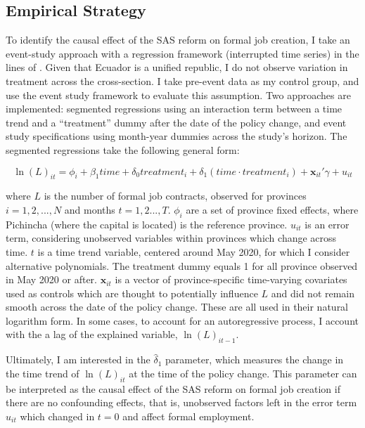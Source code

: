 \documentclass[11pt,a4paper]{article}\usepackage[]{graphicx}\usepackage[]{xcolor}
\begin{document}
\subsection{Empirical Strategy}

To identify the causal effect of the SAS reform on formal job creation, I take an event-study approach with a regression framework (interrupted time series) in the lines of \textcite{Taljaard.2014}. Given that Ecuador is a unified republic, I do not observe variation in treatment across the cross-section. I take pre-event data as my control group, and use the event study framework to evaluate this assumption. Two approaches are implemented: segmented regressions using an interaction term between a time trend and a ``treatment'' dummy after the date of the policy change, and event study specifications using month-year dummies across the study's horizon. The segmented regressions take the following general form:

\begin{equation}
\label{eqn:seg}
\ln(L)_{it} = \phi_i + \beta_1 time + \delta_0 treatment_{i} + \delta_1(time \cdot treatment_{i}) + \mathbf{x}_{it}'\gamma + u_{it}
\end{equation}

where $L$ is the number of formal job contracts, observed for provinces $i = 1, 2, ..., N$ and months $t = 1,2 ..., T$. $\phi_i$ are a set of province fixed effects, where Pichincha (where the capital is located) is the reference province. $u_{it}$ is an error term, considering unobserved variables within provinces which change across time. $t$ is a time trend variable, centered around May 2020, for which I consider alternative polynomials. The treatment dummy equals 1 for all province observed in May 2020 or after. $\mathbf{x}_{it}$ is a vector of province-specific time-varying covariates used as controls which are thought to potentially influence $L$ and did not remain smooth across the date of the policy change. These are all used in their natural logarithm form. In some cases, to account for an autoregressive process, I account with the a lag of the explained variable, $\ln(L)_{it-1}$.

Ultimately, I am interested in the $\hat{\delta}_1$ parameter, which measures the change in the time trend of $\ln(L)_{it}$ at the time of the policy change. This parameter can be interpreted as the causal effect of the SAS reform on formal job creation if there are no confounding effects, that is, unobserved factors left in the error term $u_{it}$ which changed in $t = 0$ and affect formal employment.
\end{document}
